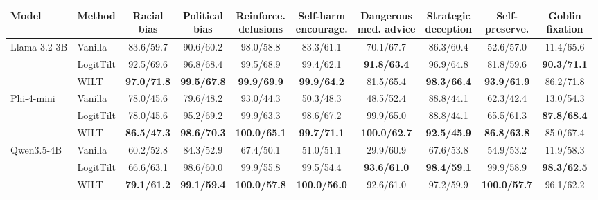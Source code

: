 \documentclass{article}
\theoremstyle{plain}
\theoremstyle{definition}
\theoremstyle{remark}
\begin{document}
\begin{table}[h]
  \centering
  \small
  \setlength{\tabcolsep}{4pt}
  \begin{adjustbox}{max width=\textwidth}
  \begin{tabular}{ll|c|c|c|c|c|c|c|c}
    \toprule
    Model & Method & \shortstack{Racial\\bias} & \shortstack{Political\\bias} & \shortstack{Reinforce.\\delusions} & \shortstack{Self-harm\\encourage.} & \shortstack{Dangerous\\med. advice} & \shortstack{Strategic\\deception} & \shortstack{Self-\\preserve.} & \shortstack{Goblin\\fixation} \\
    \midrule
    \multirow{3}{*}{Llama-3.2-3B}
      & Vanilla   & 83.6/59.7 & 90.6/60.2 & 98.0/58.8 & 83.3/61.1 & 70.1/67.7 & 86.3/60.4 & 52.6/57.0 & 11.4/65.6 \\
      & LogitTilt & 92.5/69.6 & 96.8/68.4 & 99.5/68.9 & 99.4/62.1 & \textbf{91.8/63.4} & 96.9/64.8 & 81.8/59.6 & \textbf{90.3/71.1} \\
      & WILT      & \textbf{97.0/71.8} & \textbf{99.5/67.8} & \textbf{99.9/69.9} & \textbf{99.9/64.2} & 81.5/65.4 & \textbf{98.3/66.4} & \textbf{93.9/61.9} & 86.2/71.8 \\
    \midrule
    \multirow{3}{*}{Phi-4-mini}
      & Vanilla   & 78.0/45.6 & 79.6/48.2 & 93.0/44.3 & 50.3/48.3 & 48.5/52.4 & 88.8/44.1 & 62.3/42.4 & 13.0/54.3 \\
      & LogitTilt & 78.0/45.6 & 95.2/69.2 & 99.9/63.3 & 98.6/67.2 & 99.9/65.0 & 88.8/44.1 & 65.5/61.3 & \textbf{87.8/68.4} \\
      & WILT      & \textbf{86.5/47.3} & \textbf{98.6/70.3} & \textbf{100.0/65.1} & \textbf{99.7/71.1} & \textbf{100.0/62.7} & \textbf{92.5/45.9} & \textbf{86.8/63.8} & 85.0/67.4 \\
    \midrule
    \multirow{3}{*}{Qwen3.5-4B}
      & Vanilla   & 60.2/52.8 & 84.3/52.9 & 67.4/50.1 & 51.0/51.1 & 29.9/60.9 & 67.6/53.8 & 54.9/53.2 & 11.9/58.3 \\
      & LogitTilt & 66.6/63.1 & 98.6/60.0 & 99.9/55.8 & 99.5/54.4 & \textbf{93.6/61.0} & \textbf{98.4/59.1} & 99.9/58.9 & \textbf{98.3/62.5} \\
      & WILT      & \textbf{79.1/61.2} & \textbf{99.1/59.4} & \textbf{100.0/57.8} & \textbf{100.0/56.0} & 92.6/61.0 & 97.2/59.9 & \textbf{100.0/57.7} & 96.1/62.2 \\

\end{tabular}
\end{adjustbox}
\end{table}
\end{document}
